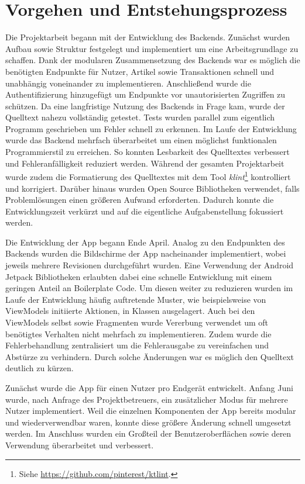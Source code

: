 \documentclass[a4paper, 11pt]{article}
\begin{document}
\section{Vorgehen und Entstehungsprozess}
\label{sec:methodologies}
Die Projektarbeit begann mit der Entwicklung des Backends.
Zunächst wurden Aufbau sowie Struktur festgelegt und implementiert um eine Arbeitsgrundlage zu schaffen.
Dank der modularen Zusammensetzung des Backends war es möglich die benötigten Endpunkte für Nutzer, Artikel sowie Transaktionen schnell und unabhängig voneinander zu implementieren.
Anschließend wurde die Authentifizierung hinzugefügt um Endpunkte vor unautorisierten Zugriffen zu schützen.
Da eine langfristige Nutzung des Backends in Frage kam, wurde der Quelltext nahezu vollständig getestet.
Tests wurden parallel zum eigentlich Programm geschrieben um Fehler schnell zu erkennen.
Im Laufe der Entwicklung wurde das Backend mehrfach überarbeitet um einen möglichst funktionalen Programmierstil zu erreichen.
So konnten Lesbarkeit des Quelltextes verbessert und Fehleranfälligkeit reduziert werden.
Während der gesamten Projektarbeit wurde zudem die Formatierung des Quelltextes mit dem Tool \textit{klint}\footnote{Siehe \url{https://github.com/pinterest/ktlint}.} kontrolliert und korrigiert.
Darüber hinaus wurden Open Source Bibliotheken verwendet, falls Problemlösungen einen größeren Aufwand erforderten.
Dadurch konnte die Entwicklungszeit verkürzt und auf die eigentliche Aufgabenstellung fokussiert werden.

Die Entwicklung der App begann Ende April.
Analog zu den Endpunkten des Backends wurden die Bildschirme der App nacheinander implementiert, wobei jeweils mehrere Revisionen durchgeführt wurden.
Eine Verwendung der Android Jetpack Bibliotheken erlaubten dabei eine schnelle Entwicklung mit einem geringen Anteil an Boilerplate Code.
Um diesen weiter zu reduzieren wurden im Laufe der Entwicklung häufig auftretende Muster, wie beispielsweise von ViewModels initiierte Aktionen, in Klassen ausgelagert.
Auch bei den ViewModels selbst sowie Fragmenten wurde Vererbung verwendet um oft benötigtes Verhalten nicht mehrfach zu implementieren.
Zudem wurde die Fehlerbehandlung zentralisiert um die Fehlerausgabe zu vereinfachen und Abstürze zu verhindern.
Durch solche Änderungen war es möglich den Quelltext deutlich zu kürzen.

Zunächst wurde die App für einen Nutzer pro Endgerät entwickelt.
Anfang Juni wurde, nach Anfrage des Projektbetreuers, ein zusätzlicher Modus für mehrere Nutzer implementiert.
Weil die einzelnen Komponenten der App bereits modular und wiederverwendbar waren, konnte diese größere Änderung schnell umgesetzt werden. 
Im Anschluss wurden ein Großteil der Benutzeroberflächen sowie deren Verwendung überarbeitet und verbessert.
\end{document}
